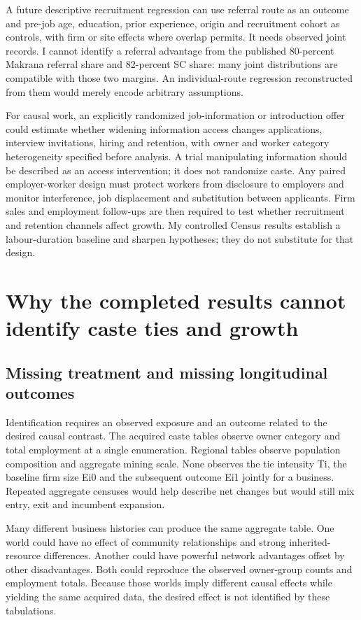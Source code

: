 \documentclass[11pt,a4paper]{report}
\begin{document}
A future descriptive recruitment regression can use referral route as an outcome and pre-job age, education, prior experience, origin and recruitment cohort as controls, with firm or site effects where overlap permits. It needs observed joint records. I cannot identify a referral advantage from the published 80-percent Makrana referral share and 82-percent SC share: many joint distributions are compatible with those two margins. An individual-route regression reconstructed from them would merely encode arbitrary assumptions.

For causal work, an explicitly randomized job-information or introduction offer could estimate whether widening information access changes applications, interview invitations, hiring and retention, with owner and worker category heterogeneity specified before analysis. A trial manipulating information should be described as an access intervention; it does not randomize caste. Any paired employer-worker design must protect workers from disclosure to employers and monitor interference, job displacement and substitution between applicants. Firm sales and employment follow-ups are then required to test whether recruitment and retention channels affect growth. My controlled Census results establish a labour-duration baseline and sharpen hypotheses; they do not substitute for that design.

\chapter{Why the completed results cannot identify caste ties and growth}
\section{Missing treatment and missing longitudinal outcomes}
Identification requires an observed exposure and an outcome related to the desired causal contrast. The acquired caste tables observe owner category and total employment at a single enumeration. Regional tables observe population composition and aggregate mining scale. None observes the tie intensity Ti, the baseline firm size Ei0 and the subsequent outcome Ei1 jointly for a business. Repeated aggregate censuses would help describe net changes but would still mix entry, exit and incumbent expansion.

Many different business histories can produce the same aggregate table. One world could have no effect of community relationships and strong inherited-resource differences. Another could have powerful network advantages offset by other disadvantages. Both could reproduce the observed owner-group counts and employment totals. Because those worlds imply different causal effects while yielding the same acquired data, the desired effect is not identified by these tabulations.
\end{document}
